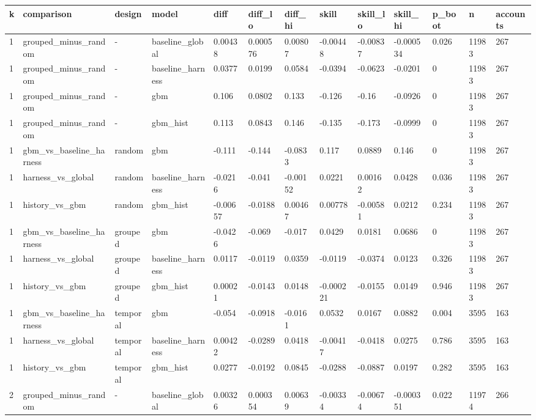 \begin{tabular}{lllllllllllll}
\toprule
k & comparison & design & model & diff & diff\_lo & diff\_hi & skill & skill\_lo & skill\_hi & p\_boot & n & accounts \\
\midrule
1 & grouped\_minus\_random & - & baseline\_global & 0.00438 & 0.000576 & 0.00807 & -0.00448 & -0.00837 & -0.000534 & 0.026 & 11983 & 267 \\
1 & grouped\_minus\_random & - & baseline\_harness & 0.0377 & 0.0199 & 0.0584 & -0.0394 & -0.0623 & -0.0201 & 0 & 11983 & 267 \\
1 & grouped\_minus\_random & - & gbm & 0.106 & 0.0802 & 0.133 & -0.126 & -0.16 & -0.0926 & 0 & 11983 & 267 \\
1 & grouped\_minus\_random & - & gbm\_hist & 0.113 & 0.0843 & 0.146 & -0.135 & -0.173 & -0.0999 & 0 & 11983 & 267 \\
1 & gbm\_vs\_baseline\_harness & random & gbm & -0.111 & -0.144 & -0.0833 & 0.117 & 0.0889 & 0.146 & 0 & 11983 & 267 \\
1 & harness\_vs\_global & random & baseline\_harness & -0.0216 & -0.041 & -0.00152 & 0.0221 & 0.00162 & 0.0428 & 0.036 & 11983 & 267 \\
1 & history\_vs\_gbm & random & gbm\_hist & -0.00657 & -0.0188 & 0.00467 & 0.00778 & -0.00581 & 0.0212 & 0.234 & 11983 & 267 \\
1 & gbm\_vs\_baseline\_harness & grouped & gbm & -0.0426 & -0.069 & -0.017 & 0.0429 & 0.0181 & 0.0686 & 0 & 11983 & 267 \\
1 & harness\_vs\_global & grouped & baseline\_harness & 0.0117 & -0.0119 & 0.0359 & -0.0119 & -0.0374 & 0.0123 & 0.326 & 11983 & 267 \\
1 & history\_vs\_gbm & grouped & gbm\_hist & 0.00021 & -0.0143 & 0.0148 & -0.000221 & -0.0155 & 0.0149 & 0.946 & 11983 & 267 \\
1 & gbm\_vs\_baseline\_harness & temporal & gbm & -0.054 & -0.0918 & -0.0161 & 0.0532 & 0.0167 & 0.0882 & 0.004 & 3595 & 163 \\
1 & harness\_vs\_global & temporal & baseline\_harness & 0.00422 & -0.0289 & 0.0418 & -0.00417 & -0.0418 & 0.0275 & 0.786 & 3595 & 163 \\
1 & history\_vs\_gbm & temporal & gbm\_hist & 0.0277 & -0.0192 & 0.0845 & -0.0288 & -0.0887 & 0.0197 & 0.282 & 3595 & 163 \\
2 & grouped\_minus\_random & - & baseline\_global & 0.00326 & 0.000354 & 0.00639 & -0.00334 & -0.00674 & -0.000351 & 0.022 & 11974 & 266 \\

\end{tabular}

